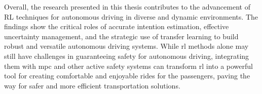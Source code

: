 
Overall, the research presented in this thesis contributes to the advancement of RL techniques for autonomous driving in diverse and dynamic environments. The findings show the critical roles of accurate intention estimation, effective uncertainty management, and the strategic use of transfer learning to build robust and versatile autonomous driving systems. While \Gls{rl} methods alone may still have challenges in guaranteeing safety for autonomous driving, integrating them with \gls{mpc} and other active safety systems can transform \gls{rl} into a powerful tool for creating comfortable and enjoyable rides for the passengers, paving the way for safer and more efficient transportation solutions.

